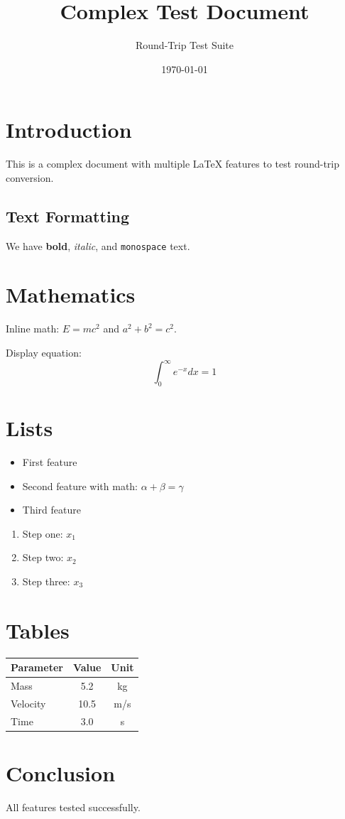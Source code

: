 \documentclass{article}
\title{Complex Test Document}
\author{Round-Trip Test Suite}
\date{\today}
\begin{document}
\maketitle

\section{Introduction}
This is a complex document with multiple LaTeX features to test round-trip conversion.

\subsection{Text Formatting}
We have \textbf{bold}, \textit{italic}, and \texttt{monospace} text.

\section{Mathematics}
Inline math: $E = mc^2$ and $a^2 + b^2 = c^2$.

Display equation:
\begin{equation}
\int_0^\infty e^{-x} dx = 1
\end{equation}

\section{Lists}
\begin{itemize}
\item First feature
\item Second feature with math: $\alpha + \beta = \gamma$
\item Third feature
\end{itemize}

\begin{enumerate}
\item Step one: $x_1$
\item Step two: $x_2$
\item Step three: $x_3$
\end{enumerate}

\section{Tables}
\begin{tabular}{lcc}
\hline
Parameter & Value & Unit \\
\hline
Mass & 5.2 & kg \\
Velocity & 10.5 & m/s \\
Time & 3.0 & s \\
\hline
\end{tabular}

\section{Conclusion}
All features tested successfully.
\end{document}
